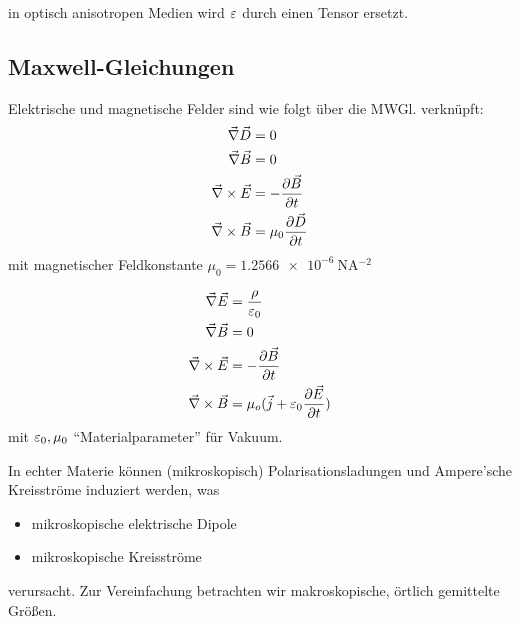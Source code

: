  in optisch anisotropen Medien wird
$\eps$ durch einen Tensor ersetzt.


\subsection{Maxwell-Gleichungen}
Elektrische und magnetische Felder sind wie folgt über die MWGl. verknüpft:
\begin{align*}	 
  \vecna\vec{D}&=0\\
  \vecna\vec{B}&=0\\
  \vecna\times\vec{E}&=-\dif[\vec{B}]{t}\\
  \vecna\times\vecB&=\mu_0 \dif[\vec{D}]{t}
\end{align*}%
%
mit magnetischer Feldkonstante 
$\mu_0=\SI{1.2566e-6}{\newton\ampere^{-2}}$%

\begin{align*}
  \vecna \vecE &=\frac{\rho}{\eps_0}\\
  \vecna\vecB&=0\\
  \vecna\times\vecE&=-\dif[\vecB]{t}\\
  \vecna\times\vecB&=\mu_o(\vec{j}+\eps_0\frac{\partial\vecE}{\partial t})
\end{align*}
mit $\eps_0,\mu_0$ \enquote{Materialparameter} für Vakuum.

In echter Materie können (mikroskopisch)
Polarisationsladungen und Ampere'sche Kreisströme induziert werden, was
\begin{itemize}
\item mikroskopische elektrische Dipole
\item mikroskopische Kreisströme
\end{itemize}
verursacht. Zur Vereinfachung betrachten wir makroskopische, örtlich
gemittelte Größen.


